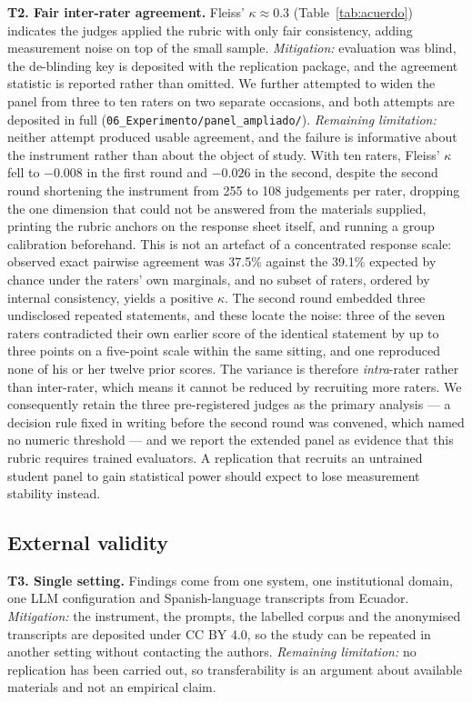 \documentclass{llncs}
\begin{document}
\textbf{T2. Fair inter-rater agreement.} Fleiss' $\kappa \approx 0.3$
(Table~\ref{tab:acuerdo}) indicates the judges applied the rubric with only fair
consistency, adding measurement noise on top of the small sample.
\emph{Mitigation:} evaluation was blind, the de-blinding key is deposited with
the replication package, and the agreement statistic is reported rather than
omitted. We further attempted to widen the panel from three to ten raters on two
separate occasions, and both attempts are deposited in full
(\texttt{06\_Experimento/panel\_ampliado/}). \emph{Remaining limitation:} neither
attempt produced usable agreement, and the failure is informative about the
instrument rather than about the object of study. With ten raters, Fleiss'
$\kappa$ fell to $-0.008$ in the first round and $-0.026$ in the second, despite
the second round shortening the instrument from 255 to 108 judgements per rater,
dropping the one dimension that could not be answered from the materials
supplied, printing the rubric anchors on the response sheet itself, and running a
group calibration beforehand. This is not an artefact of a concentrated response
scale: observed exact pairwise agreement was 37.5\% against the 39.1\% expected
by chance under the raters' own marginals, and no subset of raters, ordered by
internal consistency, yields a positive $\kappa$. The second round embedded three
undisclosed repeated statements, and these locate the noise: three of the seven
raters contradicted their own earlier score of the identical statement by up to
three points on a five-point scale within the same sitting, and one reproduced
none of his or her twelve prior scores. The variance is therefore
\emph{intra}-rater rather than inter-rater, which means it cannot be reduced by
recruiting more raters. We consequently retain the three pre-registered judges as
the primary analysis --- a decision rule fixed in writing before the second round
was convened, which named no numeric threshold --- and we report the
extended panel as evidence that this rubric requires trained evaluators. A
replication that recruits an untrained student panel to gain statistical power
should expect to lose measurement stability instead.

\subsection{External validity}

\textbf{T3. Single setting.} Findings come from one system, one institutional
domain, one LLM configuration and Spanish-language transcripts from Ecuador.
\emph{Mitigation:} the instrument, the prompts, the labelled corpus and the
anonymised transcripts are deposited under CC BY 4.0, so the study can be
repeated in another setting without contacting the authors.
\emph{Remaining limitation:} no replication has been carried out, so
transferability is an argument about available materials and not an empirical
claim.
\end{document}
